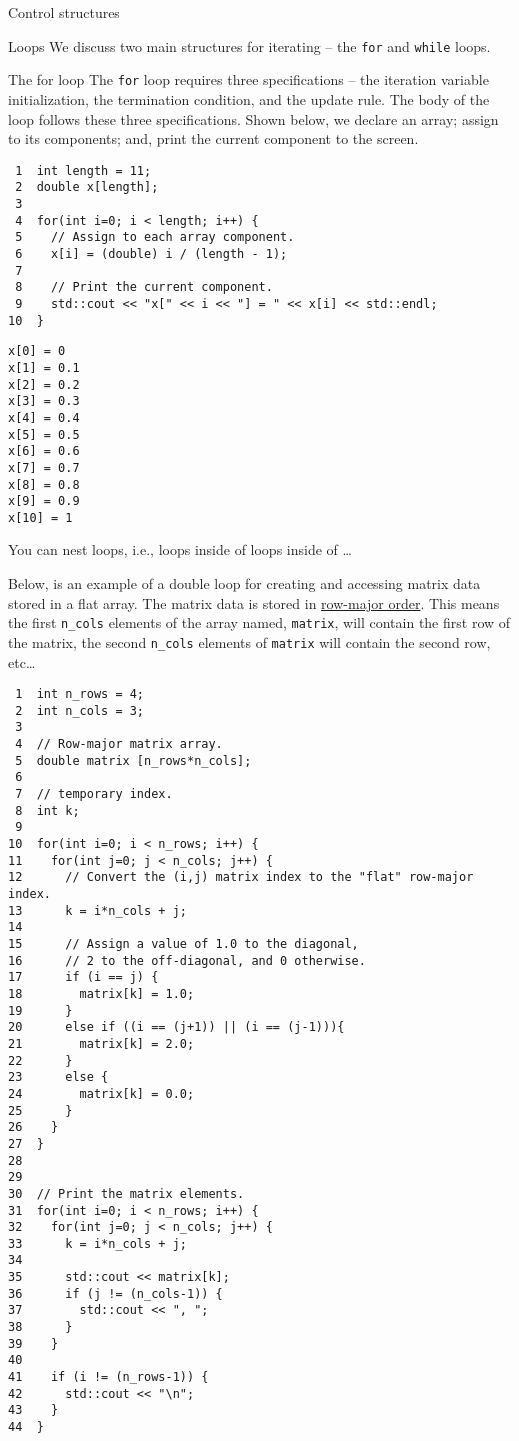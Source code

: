 \documentclass[presentation]{beamer}
\begin{document}
\begin{frame}[fragile,label={sec:orgheadline4}]{Control structures}
\begin{block}{Loops}
We discuss two main structures for iterating -- the \texttt{for} and \texttt{while} loops.

\begin{block}{The for loop}
The \texttt{for} loop requires three specifications -- the iteration variable 
initialization, the termination condition, and the update rule. The body
of the loop follows these three specifications. Shown below, we declare 
an array; assign to its components; and, print the current component to 
the screen.

\begin{verbatim}
 1  int length = 11;
 2  double x[length];
 3  
 4  for(int i=0; i < length; i++) {
 5    // Assign to each array component.
 6    x[i] = (double) i / (length - 1);
 7  
 8    // Print the current component.
 9    std::cout << "x[" << i << "] = " << x[i] << std::endl;
10  }
\end{verbatim}

\begin{verbatim}
x[0] = 0
x[1] = 0.1
x[2] = 0.2
x[3] = 0.3
x[4] = 0.4
x[5] = 0.5
x[6] = 0.6
x[7] = 0.7
x[8] = 0.8
x[9] = 0.9
x[10] = 1
\end{verbatim}

You can nest loops, i.e., loops inside of loops inside of \ldots{}

Below, is an example of a double loop for creating and accessing 
matrix data stored in a flat array. The matrix data is stored in 
\href{https://en.wikipedia.org/wiki/Row-major-order}{row-major order}. This means the first \texttt{n\_cols} elements of the 
array named, \texttt{matrix}, will contain the first row of the matrix, 
the second \texttt{n\_cols} elements of \texttt{matrix} will contain the second row, etc\ldots{}

\begin{verbatim}
 1  int n_rows = 4;
 2  int n_cols = 3;
 3  
 4  // Row-major matrix array.
 5  double matrix [n_rows*n_cols];
 6  
 7  // temporary index.
 8  int k;
 9  
10  for(int i=0; i < n_rows; i++) {
11    for(int j=0; j < n_cols; j++) {
12      // Convert the (i,j) matrix index to the "flat" row-major index.
13      k = i*n_cols + j;
14  
15      // Assign a value of 1.0 to the diagonal,
16      // 2 to the off-diagonal, and 0 otherwise.
17      if (i == j) {
18        matrix[k] = 1.0;
19      }
20      else if ((i == (j+1)) || (i == (j-1))){
21        matrix[k] = 2.0;
22      }
23      else {
24        matrix[k] = 0.0;
25      }
26    }
27  }
28  
29  
30  // Print the matrix elements.
31  for(int i=0; i < n_rows; i++) {
32    for(int j=0; j < n_cols; j++) {
33      k = i*n_cols + j;
34  
35      std::cout << matrix[k];
36      if (j != (n_cols-1)) {
37        std::cout << ", ";
38      }
39    }
40  
41    if (i != (n_rows-1)) {
42      std::cout << "\n";
43    }
44  }
\end{verbatim}


\end{block}
\end{block}
\end{frame}
\end{document}
